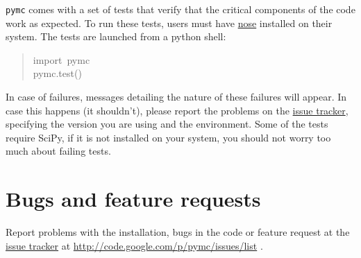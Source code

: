 \texttt{pymc} comes with a set of tests that verify that the critical components
of the code work as expected. To run these tests, users must have \href{http://somethingaboutorange.com/mrl/projects/nose/}{nose}
installed on their system. The tests are launched from a python shell:
\begin{quote}{\ttfamily \raggedright \noindent
import~pymc~\\
pymc.test()
}\end{quote}

In case of failures, messages detailing the nature of these failures will 
appear. In case this happens (it shouldn't), please report
the problems on the \href{http://code.google.com/p/pymc/issues/list.}{issue tracker}, specifying the version you are using and the
environment. Some of the tests require SciPy, if it is not installed on your 
system, you should not worry too much about failing tests.



\hypertarget{bugs-and-feature-requests}{}
\section*{Bugs and feature requests}

Report problems with the installation, bugs in the code or feature request at 
the \href{http://code.google.com/p/pymc/issues/list.}{issue tracker} at \href{http://code.google.com/p/pymc/issues/list}{http://code.google.com/p/pymc/issues/list} .

